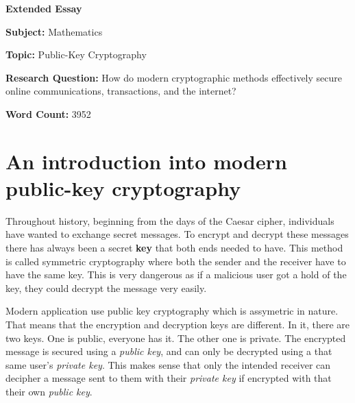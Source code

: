\documentclass[a4paper,12pt]{article}
\theoremstyle{definition}
\begin{document}
\begin{titlepage}
    \begin{center}
    
        \vspace*{1cm}
 
        \Large
        \textbf{Extended Essay}

        
 		\textbf{Subject:} Mathematics
        \vspace{0.2cm}
        
        \textbf{Topic:} Public-Key Cryptography
        \vspace{2.5cm}
		
		
		\textbf{Research Question: }How do modern cryptographic methods effectively secure online communications, transactions, and the internet?
 
        \vfill
 
 
        \vspace{0.8cm}
 
 
        \Large
       \textbf{Word Count: }3952 
 
    \end{center}
\end{titlepage}



\tableofcontents


\newpage
\section{An introduction into modern public-key cryptography}


\indent Throughout history, beginning from the days of the Caesar cipher, individuals have wanted to exchange secret messages. To encrypt and decrypt these messages there has always been a secret \textbf{key} that both ends needed to have. This method is called symmetric cryptography where both the sender and the receiver have to have the same key. This is very dangerous as if a malicious user got a hold of the key, they could decrypt the message very easily.

Modern application use  public key cryptography which is assymetric in nature. That means that the encryption and decryption keys are different. In it, there are two keys. One is public, everyone has it. The other one is private. The encrypted message is secured using a \textit{public key}, and can only be decrypted using a that same user's \textit{private key}. This makes sense that only the intended receiver can decipher a message sent to them with their \textit{private key} if encrypted with that their own \textit{public key}.
\end{document}
